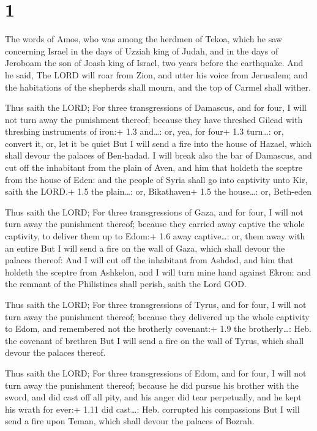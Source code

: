 \hypertarget{section}{%
\section{1}\label{section}}

 The words of Amos, who was among the herdmen of Tekoa,
which he saw concerning Israel in the days of Uzziah king of Judah, and
in the days of Jeroboam the son of Joash king of Israel, two years
before the earthquake.  And he said, The LORD will roar from
Zion, and utter his voice from Jerusalem; and the habitations of the
shepherds shall mourn, and the top of Carmel shall wither.

 Thus saith the LORD; For three transgressions of Damascus,
and for four, I will not turn away the punishment thereof; because they
have threshed Gilead with threshing instruments of iron:+ 1.3 and\ldots:
or, yea, for four+ 1.3 turn\ldots: or, convert it, or, let it be quiet
 But I will send a fire into the house of Hazael, which
shall devour the palaces of Ben-hadad.  I will break also
the bar of Damascus, and cut off the inhabitant from the plain of Aven,
and him that holdeth the sceptre from the house of Eden: and the people
of Syria shall go into captivity unto Kir, saith the LORD.+ 1.5 the
plain\ldots: or, Bikathaven+ 1.5 the house\ldots: or, Beth-eden

 Thus saith the LORD; For three transgressions of Gaza,
and for four, I will not turn away the punishment thereof; because they
carried away captive the whole captivity, to deliver them up to Edom:+
1.6 away captive\ldots: or, them away with an entire  But I
will send a fire on the wall of Gaza, which shall devour the palaces
thereof:  And I will cut off the inhabitant from Ashdod, and
him that holdeth the sceptre from Ashkelon, and I will turn mine hand
against Ekron: and the remnant of the Philistines shall perish, saith
the Lord GOD.

 Thus saith the LORD; For three transgressions of Tyrus,
and for four, I will not turn away the punishment thereof; because they
delivered up the whole captivity to Edom, and remembered not the
brotherly covenant:+ 1.9 the brotherly\ldots: Heb. the covenant of
brethren  But I will send a fire on the wall of Tyrus,
which shall devour the palaces thereof.

 Thus saith the LORD; For three transgressions of Edom,
and for four, I will not turn away the punishment thereof; because he
did pursue his brother with the sword, and did cast off all pity, and
his anger did tear perpetually, and he kept his wrath for ever:+ 1.11
did cast\ldots: Heb. corrupted his compassions  But I will
send a fire upon Teman, which shall devour the palaces of Bozrah.

